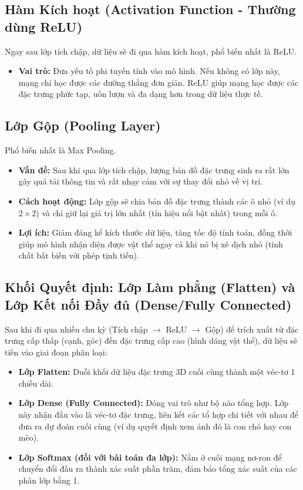 \documentclass[12pt,a4paper]{article}
\begin{document}
\subsection{Hàm Kích hoạt (Activation Function - Thường dùng ReLU)}
Ngay sau lớp tích chập, dữ liệu sẽ đi qua hàm kích hoạt, phổ biến nhất là ReLU.
\begin{itemize}
    \item \textbf{Vai trò:} Đưa yếu tố phi tuyến tính vào mô hình. Nếu không có lớp này, mạng chỉ học được các đường thẳng đơn giản. ReLU giúp mạng học được các đặc trưng phức tạp, uốn lượn và đa dạng hơn trong dữ liệu thực tế.
\end{itemize}

\subsection{Lớp Gộp (Pooling Layer)}
Phổ biến nhất là Max Pooling.
\begin{itemize}
    \item \textbf{Vấn đề:} Sau khi qua lớp tích chập, lượng bản đồ đặc trưng sinh ra rất lớn gây quá tải thông tin và rất nhạy cảm với sự thay đổi nhỏ về vị trí.
    \item \textbf{Cách hoạt động:} Lớp gộp sẽ chia bản đồ đặc trưng thành các ô nhỏ (ví dụ $2 \times 2$) và chỉ giữ lại giá trị lớn nhất (tín hiệu nổi bật nhất) trong mỗi ô.
    \item \textbf{Lợi ích:} Giảm đáng kể kích thước dữ liệu, tăng tốc độ tính toán, đồng thời giúp mô hình nhận diện được vật thể ngay cả khi nó bị xê dịch nhỏ (tính chất bất biến với phép tịnh tiến).
\end{itemize}

\subsection{Khối Quyết định: Lớp Làm phẳng (Flatten) và Lớp Kết nối Đầy đủ (Dense/Fully Connected)}
Sau khi đi qua nhiều chu kỳ (Tích chập $\rightarrow$ ReLU $\rightarrow$ Gộp) để trích xuất từ đặc trưng cấp thấp (cạnh, góc) đến đặc trưng cấp cao (hình dáng vật thể), dữ liệu sẽ tiến vào giai đoạn phân loại:
\begin{itemize}
    \item \textbf{Lớp Flatten:} Duỗi khối dữ liệu đặc trưng 3D cuối cùng thành một véc-tơ 1 chiều dài.
    \item \textbf{Lớp Dense (Fully Connected):} Đóng vai trò như bộ não tổng hợp. Lớp này nhận đầu vào là véc-tơ đặc trưng, liên kết các tổ hợp chi tiết với nhau để đưa ra dự đoán cuối cùng (ví dụ quyết định xem ảnh đó là con chó hay con mèo).
    \item \textbf{Lớp Softmax (đối với bài toán đa lớp):} Nằm ở cuối mạng nơ-ron để chuyển đổi đầu ra thành xác suất phần trăm, đảm bảo tổng xác suất của các phân lớp bằng 1.
\end{itemize}
\end{document}
